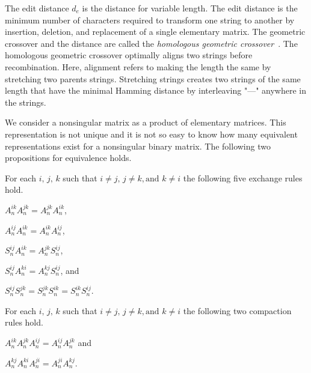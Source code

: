 The edit distance $ d_e $ is the distance for variable length.
The edit distance is the minimum number of characters required to transform one string to another by insertion, deletion, and replacement of a single elementary matrix.
The geometric crossover and the distance are called the \textit{homologous geometric crossover}~\cite{moraglio2006geometric}.
The homologous geometric crossover optimally aligns two strings before recombination.
Here, alignment refers to making the length the same by stretching two parents strings.
Stretching strings creates two strings of the same length that have the minimal Hamming distance by interleaving "---" anywhere in the strings.

We consider a nonsingular matrix as a product of elementary matrices.
This representation is not unique and it is not so easy to know how many equivalent representations exist for a nonsingular binary matrix.
The following two propositions for equivalence holds.









\begin{Proposition}
    For each $ i,\, j,\, k $ such that $ i \neq j,\, j \neq k, \text{and } k \neq i $ the following five exchange rules hold. \\
    \begin{enumerate*}
    \item $ A_n^{ik} A_n^{jk} = A_n^{jk} A_n^{ik} $, 
    \item $ A_n^{ij} A_n^{ik} = A_n^{ik} A_n^{ij} $, 
    \item $ S_n^{ij} A_n^{ik} = A_n^{jk} S_n^{ij} $,
    \item $ S_n^{ij} A_n^{ki} = A_n^{kj} S_n^{ij} $, and 
    \item $ S_n^{ij} S_n^{jk} = S_n^{jk} S_n^{ik} = S_n^{ik} S_n^{ij} $.
    \end{enumerate*}
\end{Proposition}

\begin{Proposition}
    For each $ i,\, j,\, k $ such that $ i \neq j,\, j \neq k, \text{and } k \neq i $ the following two compaction rules hold. \\
    \begin{enumerate*}
    \item $ A_n^{ik} A_n^{jk} A_n^{ij} = A_n^{ij} A_n^{jk} $ and
    \item $ A_n^{kj} A_n^{ki} A_n^{ji} = A_n^{ji} A_n^{kj} $.
    \end{enumerate*}
\end{Proposition}


